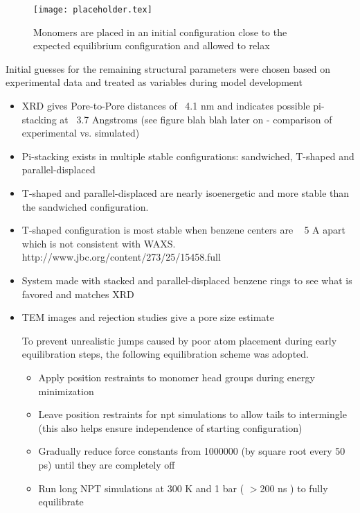 \documentclass{article}
\begin{document}
\begin{itemize}
\begin{itemize}
	\begin{figure}
	\texttt{[image: placeholder.tex]}
		\caption{Monomers are placed in an initial configuration close to the expected equilibrium configuration and allowed to relax}
		\label{fig:initial}
	\end{figure}

	\noindent Initial guesses for the remaining structural parameters were chosen based on experimental data and treated as variables during model development 
	\begin{itemize}
		\item XRD gives Pore-to-Pore distances of ~4.1 nm and indicates possible pi-stacking at ~3.7 Angstroms (see figure blah blah later on - comparison of experimental vs. simulated)
		\item Pi-stacking exists in multiple stable configurations: sandwiched, T-shaped and parallel-displaced
		\item T-shaped and parallel-displaced are nearly isoenergetic and more stable than the sandwiched configuration.
		\item T-shaped configuration is most stable when benzene centers are ~ 5 A apart which is not consistent with WAXS. http://www.jbc.org/content/273/25/15458.full 
		\item System made with stacked and parallel-displaced benzene rings to see what is favored and matches XRD
		\item TEM images and rejection studies give a pore size estimate

	To prevent unrealistic jumps caused by poor atom placement during early equilibration steps, the following equilibration scheme was adopted.
		\begin{itemize}
			\item Apply position restraints to monomer head groups during energy minimization 
			\item Leave position restraints for npt simulations to allow tails to intermingle (this also helps ensure independence of starting configuration)
			\item Gradually reduce force constants from 1000000 (by square root every 50 ps) until they are completely off
			\item Run long NPT simulations at 300 K and 1 bar ( $>$200 ns ) to fully equilibrate
		\end{itemize}
	\end{itemize}
	

\end{itemize}
\end{itemize}
\end{document}
